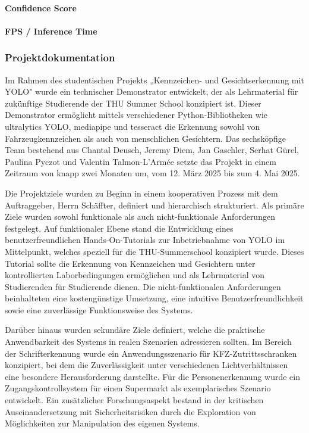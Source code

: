 \paragraph{Confidence Score}
\paragraph{FPS / Inference Time}

\subsubsection{Projektdokumentation}

Im Rahmen des studentischen Projekts „Kennzeichen- und Gesichtserkennung mit YOLO" wurde ein technischer Demonstrator entwickelt, der als Lehrmaterial für zukünftige Studierende der THU Summer School konzipiert ist. Dieser Demonstrator ermöglicht mittels verschiedener Python-Bibliotheken wie ultralytics YOLO, mediapipe und tesseract die Erkennung sowohl von Fahrzeugkennzeichen als auch von menschlichen Gesichtern. Das sechsköpfige Team bestehend aus Chantal Deusch, Jeremy Diem, Jan Gaschler, Serhat Gürel, Paulina Pyczot und Valentin Talmon-L'Armée setzte das Projekt in einem Zeitraum von knapp zwei Monaten um, vom 12. März 2025 bis zum 4. Mai 2025.

Die Projektziele wurden zu Beginn in einem kooperativen Prozess mit dem Auftraggeber, Herrn Schäffter, definiert und hierarchisch strukturiert. Als primäre Ziele wurden sowohl funktionale als auch nicht-funktionale Anforderungen festgelegt. Auf funktionaler Ebene stand die Entwicklung eines benutzerfreundlichen Hands-On-Tutorials zur Inbetriebnahme von YOLO im Mittelpunkt, welches speziell für die THU-Summerschool konzipiert wurde. Dieses Tutorial sollte die Erkennung von Kennzeichen und Gesichtern unter kontrollierten Laborbedingungen ermöglichen und als Lehrmaterial von Studierenden für Studierende dienen. Die nicht-funktionalen Anforderungen beinhalteten eine kostengünstige Umsetzung, eine intuitive Benutzerfreundlichkeit sowie eine zuverlässige Funktionsweise des Systems.

Darüber hinaus wurden sekundäre Ziele definiert, welche die praktische Anwendbarkeit des Systems in realen Szenarien adressieren sollten. Im Bereich der Schrifterkennung wurde ein Anwendungsszenario für KFZ-Zutrittsschranken konzipiert, bei dem die Zuverlässigkeit unter verschiedenen Lichtverhältnissen eine besondere Herausforderung darstellte. Für die Personenerkennung wurde ein Zugangskontrollsystem für einen Supermarkt als exemplarisches Szenario entwickelt. Ein zusätzlicher Forschungsaspekt bestand in der kritischen Auseinandersetzung mit Sicherheitsrisiken durch die Exploration von Möglichkeiten zur Manipulation des eigenen Systems.

